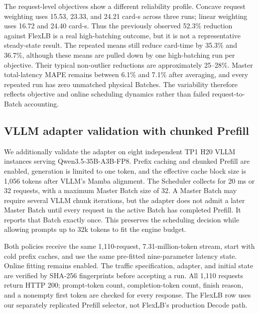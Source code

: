 \documentclass[10pt]{article}
\begin{document}
The request-level objectives show a different reliability profile. Concave
request weighting uses 15.53, 23.33, and 24.21 card-s across three runs;
linear weighting uses 16.72 and 24.40 card-s. Thus the previously observed
52.3\% reduction against FlexLB is a real high-batching outcome, but it is not
a representative steady-state result. The repeated means still reduce
card-time by 35.3\% and 36.7\%, although these means are pulled down by one
high-batching run per objective. Their typical non-outlier reductions are
approximately 25--28\%. Master total-latency MAPE remains between 6.1\% and
7.1\% after averaging, and every repeated run has zero unmatched physical
Batches. The variability therefore reflects objective and online scheduling
dynamics rather than failed request-to-Batch accounting.

\subsection{VLLM adapter validation with chunked Prefill}

We additionally validate the adapter on eight independent TP1 H20 VLLM
instances serving Qwen3.5-35B-A3B-FP8. Prefix caching and chunked Prefill are
enabled, generation is limited to one token, and the effective cache block
size is 1,056 tokens after VLLM's Mamba alignment. The Scheduler collects for
20 ms or 32 requests, with a maximum Master Batch size of 32. A Master Batch
may require several VLLM chunk iterations, but the adapter does not admit a
later Master Batch until every request in the active Batch has completed
Prefill. It reports that Batch exactly once. This preserves the scheduling
decision while allowing prompts up to 32k tokens to fit the engine budget.

Both policies receive the same 1,110-request, 7.31-million-token stream, start
with cold prefix caches, and use the same pre-fitted nine-parameter latency
state. Online fitting remains enabled. The traffic specification, adapter,
and initial state are verified by SHA-256 fingerprints before accepting a
run. All 1,110 requests return HTTP 200; prompt-token count, completion-token
count, finish reason, and a nonempty first token are checked for every
response. The FlexLB row uses our separately replicated Prefill selector,
not FlexLB's production Decode path.
\end{document}
